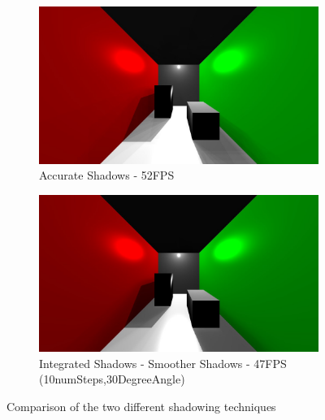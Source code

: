 \begin{figure}
        \centering
        \begin{subfigure}[b]{1.0\textwidth}
                \includegraphics[width=\textwidth]{AltResults/oldmethod.jpg}
                \caption{Accurate Shadows - 52FPS}
        \end{subfigure}
        \centering
        \begin{subfigure}[b]{1.0\textwidth}
                \includegraphics[width=\textwidth]{AltResults/10numSteps30Angle.jpg}
                \caption{Integrated Shadows - Smoother Shadows - 47FPS (10numSteps,30DegreeAngle)}
        \end{subfigure}
        \caption{Comparison of the two different shadowing techniques}\label{fig:methodCompare}
\end{figure}

